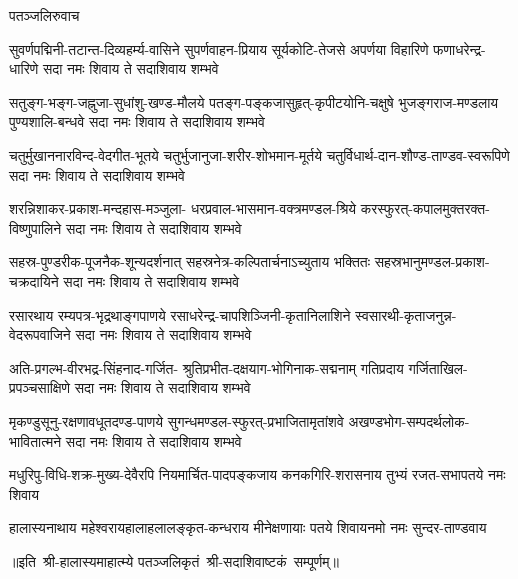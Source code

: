 
\centerline{पतञ्जलिरुवाच}
\fourlineindentedshloka
{सुवर्णपद्मिनी-तटान्त-दिव्यहर्म्य-वासिने}
{सुपर्णवाहन-प्रियाय सूर्यकोटि-तेजसे}
{अपर्णया विहारिणे फणाधरेन्द्र-धारिणे}
{सदा नमः शिवाय ते सदाशिवाय शम्भवे}

\fourlineindentedshloka
{सतुङ्ग-भङ्ग-जह्नुजा-सुधांशु-खण्ड-मौलये}
{पतङ्ग-पङ्कजासुहृत्-कृपीटयोनि-चक्षुषे}
{भुजङ्गराज-मण्डलाय पुण्यशालि-बन्धवे}
{सदा नमः शिवाय ते सदाशिवाय शम्भवे}

\fourlineindentedshloka
{चतुर्मुखाननारविन्द-वेदगीत-भूतये}
{चतुर्भुजानुजा-शरीर-शोभमान-मूर्तये}
{चतुर्विधार्थ-दान-शौण्ड-ताण्डव-स्वरूपिणे}
{सदा नमः शिवाय ते सदाशिवाय शम्भवे}

\fourlineindentedshloka
{शरन्निशाकर-प्रकाश-मन्दहास-मञ्जुला-}
{धरप्रवाल-भासमान-वक्त्रमण्डल-श्रिये}
{करस्फुरत्-कपालमुक्तरक्त-विष्णुपालिने}
{सदा नमः शिवाय ते सदाशिवाय शम्भवे}

\fourlineindentedshloka
{सहस्र-पुण्डरीक-पूजनैक-शून्यदर्शनात्}
{सहस्रनेत्र-कल्पितार्चनाऽच्युताय भक्तितः}
{सहस्रभानुमण्डल-प्रकाश-चक्रदायिने}
{सदा नमः शिवाय ते सदाशिवाय शम्भवे}

\fourlineindentedshloka
{रसारथाय रम्यपत्र-भृद्रथाङ्गपाणये}
{रसाधरेन्द्र-चापशिञ्जिनी-कृतानिलाशिने}
{स्वसारथी-कृताजनुन्न-वेदरूपवाजिने}
{सदा नमः शिवाय ते सदाशिवाय शम्भवे}

\fourlineindentedshloka
{अति-प्रगल्भ-वीरभद्र-सिंहनाद-गर्जित-}
{श्रुतिप्रभीत-दक्षयाग-भोगिनाक-सद्मनाम्}
{गतिप्रदाय गर्जिताखिल-प्रपञ्चसाक्षिणे}
{सदा नमः शिवाय ते सदाशिवाय शम्भवे}

\fourlineindentedshloka
{मृकण्डुसूनु-रक्षणावधूतदण्ड-पाणये}
{सुगन्धमण्डल-स्फुरत्-प्रभाजितामृतांशवे}
{अखण्डभोग-सम्पदर्थलोक-भावितात्मने}
{सदा नमः शिवाय ते सदाशिवाय शम्भवे}

\twolineshloka
{मधुरिपु-विधि-शक्र-मुख्य-देवैरपि नियमार्चित-पादपङ्कजाय}
{कनकगिरि-शरासनाय तुभ्यं रजत-सभापतये नमः शिवाय}

\fourlineindentedshloka
{हालास्यनाथाय महेश्वराय}{हालाहलालङ्कृत-कन्धराय}
{मीनेक्षणायाः पतये शिवाय}{नमो नमः सुन्दर-ताण्डवाय}

॥इति~श्री-हालास्यमाहात्म्ये पतञ्जलिकृतं~श्री-सदाशिवाष्टकं~सम्पूर्णम्॥